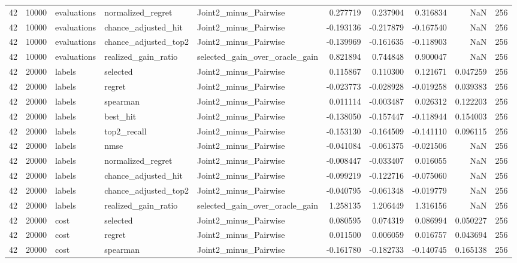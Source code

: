 \begin{tabular}{rrlllrrrrr}
42 & 10000 & evaluations & normalized_regret & Joint2_minus_Pairwise & 0.277719 & 0.237904 & 0.316834 & NaN & 256 \\
42 & 10000 & evaluations & chance_adjusted_hit & Joint2_minus_Pairwise & -0.193136 & -0.217879 & -0.167540 & NaN & 256 \\
42 & 10000 & evaluations & chance_adjusted_top2 & Joint2_minus_Pairwise & -0.139969 & -0.161635 & -0.118903 & NaN & 256 \\
42 & 10000 & evaluations & realized_gain_ratio & selected_gain_over_oracle_gain & 0.821894 & 0.744848 & 0.900047 & NaN & 256 \\
42 & 20000 & labels & selected & Joint2_minus_Pairwise & 0.115867 & 0.110300 & 0.121671 & 0.047259 & 256 \\
42 & 20000 & labels & regret & Joint2_minus_Pairwise & -0.023773 & -0.028928 & -0.019258 & 0.039383 & 256 \\
42 & 20000 & labels & spearman & Joint2_minus_Pairwise & 0.011114 & -0.003487 & 0.026312 & 0.122203 & 256 \\
42 & 20000 & labels & best_hit & Joint2_minus_Pairwise & -0.138050 & -0.157447 & -0.118944 & 0.154003 & 256 \\
42 & 20000 & labels & top2_recall & Joint2_minus_Pairwise & -0.153130 & -0.164509 & -0.141110 & 0.096115 & 256 \\
42 & 20000 & labels & nmse & Joint2_minus_Pairwise & -0.041084 & -0.061375 & -0.021506 & NaN & 256 \\
42 & 20000 & labels & normalized_regret & Joint2_minus_Pairwise & -0.008447 & -0.033407 & 0.016055 & NaN & 256 \\
42 & 20000 & labels & chance_adjusted_hit & Joint2_minus_Pairwise & -0.099219 & -0.122716 & -0.075060 & NaN & 256 \\
42 & 20000 & labels & chance_adjusted_top2 & Joint2_minus_Pairwise & -0.040795 & -0.061348 & -0.019779 & NaN & 256 \\
42 & 20000 & labels & realized_gain_ratio & selected_gain_over_oracle_gain & 1.258135 & 1.206449 & 1.316156 & NaN & 256 \\
42 & 20000 & cost & selected & Joint2_minus_Pairwise & 0.080595 & 0.074319 & 0.086994 & 0.050227 & 256 \\
42 & 20000 & cost & regret & Joint2_minus_Pairwise & 0.011500 & 0.006059 & 0.016757 & 0.043694 & 256 \\
42 & 20000 & cost & spearman & Joint2_minus_Pairwise & -0.161780 & -0.182733 & -0.140745 & 0.165138 & 256 \\

\end{tabular}
